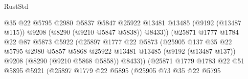 \begin{lexlean}{RustStd}
\begin{coremodule}
                                        @35
                                        @22
                                        @5795
                                        @2980
                                        @5837
                                        @5847
                                        @25922
                                        @13481
                                        @13485
                                        (@9192 (@13487 @115))
                                        @9208
                                        (@8290 (@9210 @5847 @5838))
                                        @8433))
                                    (@25871
                                      @1777
                                      @1784
                                      @22
                                      @87
                                      @5873
                                      @5922
                                      (@25897
                                        @1777
                                        @22
                                        @5873
                                        (@25905
                                          @137
                                          @35
                                          @22
                                          @5795
                                          @2980
                                          @5857
                                          @5868
                                          @25922
                                          @13481
                                          @13485
                                          (@9192 (@13487 @137))
                                          @9208
                                          (@8290 (@9210 @5868 @5858))
                                          @8433))
                                      (@25871
                                        @1779
                                        @1783
                                        @22
                                        @51
                                        @5895
                                        @5921
                                        (@25897
                                          @1779
                                          @22
                                          @5895
                                          (@25905
                                            @73
                                            @35
                                            @22
                                            @5795

\end{coremodule}
\end{lexlean}
